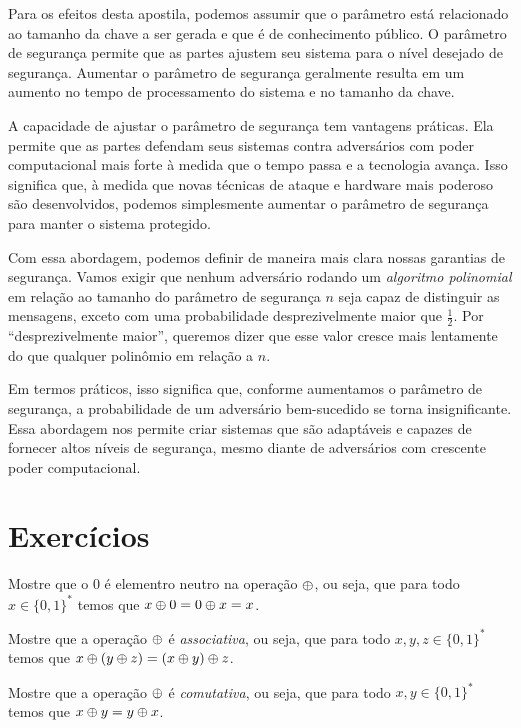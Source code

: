 Para os efeitos desta apostila, podemos assumir que o parâmetro está relacionado ao tamanho da chave a ser gerada e que é de conhecimento público.
O parâmetro de segurança permite que as partes ajustem seu sistema para o nível desejado de segurança.
Aumentar o parâmetro de segurança geralmente resulta em um aumento no tempo de processamento do sistema e no tamanho da chave.

A capacidade de ajustar o parâmetro de segurança tem vantagens práticas.
Ela permite que as partes defendam seus sistemas contra adversários com poder computacional mais forte à medida que o tempo passa e a tecnologia avança.
Isso significa que, à medida que novas técnicas de ataque e hardware mais poderoso são desenvolvidos, podemos simplesmente aumentar o parâmetro de segurança para manter o sistema protegido.

Com essa abordagem, podemos definir de maneira mais clara nossas garantias de segurança.
Vamos exigir que nenhum adversário rodando um {\em algoritmo polinomial} em relação ao tamanho do parâmetro de segurança $n$ seja capaz de distinguir as mensagens, exceto com uma probabilidade desprezivelmente maior que $\frac{1}{2}$.
Por ``desprezivelmente maior'', queremos dizer que esse valor cresce mais lentamente do que qualquer polinômio em relação a $n$.

Em termos práticos, isso significa que, conforme aumentamos o parâmetro de segurança, a probabilidade de um adversário bem-sucedido se torna insignificante.
Essa abordagem nos permite criar sistemas que são adaptáveis e capazes de fornecer altos níveis de segurança, mesmo diante de adversários com crescente poder computacional.


\section{Exercícios}
\label{sec:exercicios}

\begin{exercicio}
  Mostre que o $0$ é elementro neutro na operação $\oplus$, ou seja, que para todo $x \in \{0,1\}^*$ temos que $x \oplus 0 = 0 \oplus x = x$.
\end{exercicio}

\begin{exercicio}
  Mostre que a operação $\oplus$ é {\em associativa}, ou seja, que para todo $x,y,z \in \{0,1\}^*$ temos que $x \oplus (y \oplus z) = (x \oplus y) \oplus z$.
\end{exercicio}

\begin{exercicio}
  Mostre que a operação $\oplus$ é {\em comutativa}, ou seja, que para todo $x,y \in \{0,1\}^*$ temos que $x \oplus y = y \oplus x$.
\end{exercicio}

